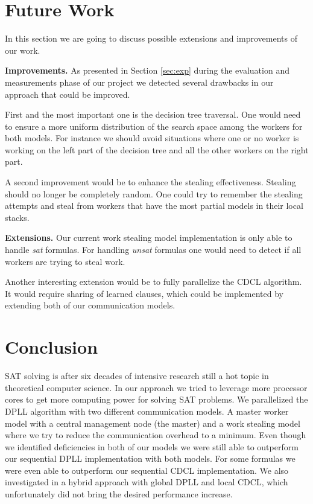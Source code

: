 \documentclass[letterpaper]{article}
\newcommand{\mypar}[1]{{\bf #1.}}
\begin{document}
\section{Future Work}\label{sec:futureWork}
In this section we are going to discuss possible extensions and improvements of our work.

\mypar{Improvements}
As presented in Section \ref{sec:exp} during the evaluation and measurements phase of our project we detected several drawbacks in our approach that could be improved.

First and the most important one is the decision tree traversal.
One would need to ensure a more uniform distribution of the search space among the workers for both models.
For instance we should avoid situations where one or no worker is working on the left part of the decision tree and all the other workers on the right part.

A second improvement would be to enhance the stealing effectiveness.
Stealing should no longer be completely random.
One could try to remember the stealing attempts and steal from workers that have the most partial models in their local stacks.

\mypar{Extensions}
Our current work stealing model implementation is only able to handle \textit{sat} formulas.
For handling \textit{unsat} formulas one would need to detect if all workers are trying to steal work.

Another interesting extension would be to fully parallelize the CDCL algorithm.
It would require sharing of learned clauses, which could be implemented by extending both of our communication models.

\section{Conclusion}\label{sec:conclusion}
SAT solving is after six decades of intensive research still a hot topic in theoretical computer science.
In our approach we tried to leverage more processor cores to get more computing power for solving SAT problems.
We parallelized the DPLL algorithm with two different communication models.
A master worker model with a central management node (the master) and a work stealing model where we try to reduce the communication overhead to a minimum.
Even though we identified deficiencies in both of our models we were still able to outperform our sequential DPLL implementation with both models.
For some formulas we were even able to outperform our sequential CDCL implementation.
We also investigated in a hybrid approach with global DPLL and local CDCL, which unfortunately did not bring the desired performance increase.
\end{document}
